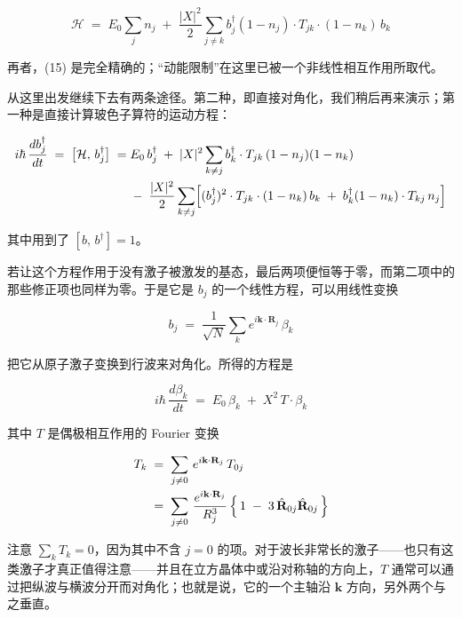 
\begin{equation*}
\mathcal{H} \;=\; E_0 \sum_j n_j \;+\; \frac{|X|^{2}}{2} \sum_{j\neq k} b_j^{\dagger}(1-n_j)\cdot T_{jk}\cdot(1-n_k)\, b_k \tag{15}
\end{equation*}

再者，(15) 是完全精确的；“动能限制”在这里已被一个非线性相互作用所取代。

从这里出发继续下去有两条途径。第二种，即直接对角化，我们稍后再来演示；第一种是直接计算玻色子算符的运动方程：

\begin{align*}
i\hbar\,\frac{db_j^{\dagger}}{dt} \;=\; \bigl[\mathcal{H},\, b_j^{\dagger}\bigr] \;=\;& E_0\, b_j^{\dagger} \;+\; |X|^{2} \sum_{k\neq j} b_k^{\dagger}\cdot T_{jk}\,(1-n_j)(1-n_k) \\
&-\; \frac{|X|^{2}}{2} \sum_{k\neq j} \Bigl[(b_j^{\dagger})^{2}\cdot T_{jk}\cdot(1-n_k)\, b_k \;+\; b_k^{\dagger}(1-n_k)\cdot T_{kj}\, n_j\Bigr]
\end{align*}

其中用到了 $[b,\, b^{\dagger}]=1$。

若让这个方程作用于没有激子被激发的基态，最后两项便恒等于零，而第二项中的那些修正项也同样为零。于是它是 $b_j$ 的一个线性方程，可以用线性变换

\begin{equation*}
b_j \;=\; \frac{1}{\sqrt{N}} \sum_k e^{i\mathbf{k}\cdot\mathbf{R}_j}\, \beta_k
\end{equation*}

把它从原子激子变换到行波来对角化。所得的方程是

\begin{equation*}
i\hbar\,\frac{d\beta_k}{dt} \;=\; E_0\, \beta_k \;+\; X^{2}\, T\cdot \beta_k
\end{equation*}

其中 $T$ 是偶极相互作用的 Fourier 变换

\begin{align*}
T_k \;&=\; \sum_{j\neq 0}\, e^{i\mathbf{k}\cdot\mathbf{R}_j}\, T_{0j} \\
&=\; \sum_{j\neq 0}\, \frac{e^{i\mathbf{k}\cdot\mathbf{R}_j}}{R_j^{3}}\, \Bigl\{\, 1 \;-\; 3\,\hat{\mathbf{R}}_{0j}\hat{\mathbf{R}}_{0j} \,\Bigr\}
\end{align*}

注意 $\sum_k T_k = 0$，因为其中不含 $j=0$ 的项。对于波长非常长的激子——也只有这类激子才真正值得注意——并且在立方晶体中或沿对称轴的方向上，$T$ 通常可以通过把纵波与横波分开而对角化；也就是说，它的一个主轴沿 $\mathbf{k}$ 方向，另外两个与之垂直。

